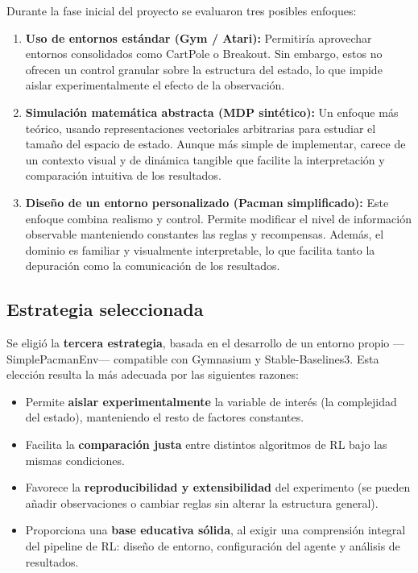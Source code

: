 Durante la fase inicial del proyecto se evaluaron tres posibles enfoques:

\begin{enumerate}
	\item \textbf{Uso de entornos estándar (Gym / Atari):}
Permitiría aprovechar entornos consolidados como CartPole o Breakout. Sin embargo, estos no ofrecen un control granular sobre la estructura del estado, lo que impide aislar experimentalmente el efecto de la observación.
	\item \textbf{Simulación matemática abstracta (MDP sintético):}
Un enfoque más teórico, usando representaciones vectoriales arbitrarias para estudiar el tamaño del espacio de estado. Aunque más simple de implementar, carece de un contexto visual y de dinámica tangible que facilite la interpretación y comparación intuitiva de los resultados.
	\item \textbf{Diseño de un entorno personalizado (Pacman simplificado):}
Este enfoque combina realismo y control. Permite modificar el nivel de información observable manteniendo constantes las reglas y recompensas.
Además, el dominio es familiar y visualmente interpretable, lo que facilita tanto la depuración como la comunicación de los resultados.
\end{enumerate}

\subsection{Estrategia seleccionada}

Se eligió la \textbf{tercera estrategia}, basada en el desarrollo de un entorno propio —SimplePacmanEnv— compatible con Gymnasium y Stable-Baselines3.
Esta elección resulta la más adecuada por las siguientes razones:

\begin{itemize}
	\item Permite \textbf{aislar experimentalmente} la variable de interés (la complejidad del estado), manteniendo el resto de factores constantes.
	\item Facilita la \textbf{comparación justa} entre distintos algoritmos de RL bajo las mismas condiciones.
	\item Favorece la \textbf{reproducibilidad y extensibilidad} del experimento (se pueden añadir observaciones o cambiar reglas sin alterar la estructura general).
	\item Proporciona una \textbf{base educativa sólida}, al exigir una comprensión integral del pipeline de RL: diseño de entorno, configuración del agente y análisis de resultados.
\end{itemize}